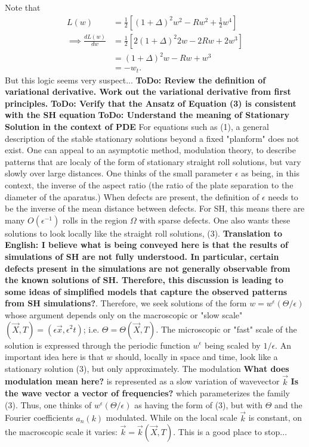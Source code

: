 \documentclass[12pt]{article}
\newcounter{solution}
\begin{document}
Note that
\begin{align*}
    L(w) &= \frac{1}{2}\left[ (1+\Delta)^2 w^2 -Rw^2 + \frac{1}{2}w^4\right]\\
    \implies \frac{dL(w)}{dw} &= \frac{1}{2}\left[ 2(1+\Delta)^2 2w -2Rw +2w^3 \right]\\
                              &= (1+\Delta)^2w -Rw + w^3\\
                              &= -w_t.
\end{align*}
But this logic seems very suspect... \textbf{ToDo: Review the definition of variational derivative. Work out the variational derivative from first principles.} \textbf{ToDo: Verify that the Ansatz of Equation (3) is consistent with the SH equation} \textbf{ToDo: Understand the meaning of Stationary Solution in the context of PDE}\newline
\hspace*{10mm} For equations such as (1), a general description of the stable stationary solutions beyond a fixed "planform" does not exist. One can appeal to an asymptotic method, modulation theory, to describe patterns that are localy of the form of stationary straight roll solutions, but vary slowly over large distances. One thinks of the small parameter $\epsilon$ as being, in this context, the inverse of the aspect ratio (the ratio of the plate separation to the diameter of the aparatus.) When defects are present, the definition of $\epsilon$ needs to be the inverse of the mean distance between defects. For SH, this means there are many $O(\epsilon^{-1})$ rolls in the region $\Omega$ with sparse defects. One also wants these solutions to look locally like the straight roll solutions, (3). \textbf{Translation to English: I believe what is being conveyed here is that the results of simulations of SH are not fully understood. In particular, certain defects present in the simulations are not generally observable from the known solutions of SH. Therefore, this discussion is leading to some ideas of simplified models that capture the observed patterns from SH simulations?}. Therefore, we seek solutions of the form $w = w^{\epsilon}(\Theta / \epsilon)$ whose argument depends only on the macroscopic or "slow scale" $(\vec{X},T)=(\epsilon \vec{x},\epsilon^2t)$; i.e. $\Theta = \Theta(\vec{X},T)$. The microscopic or "fast" scale of the solution is expressed through the periodic function $w^{\epsilon}$ being scaled by $1/\epsilon$. An important idea here is that $w$ should, locally in space and time, look like a stationary solution (3), but only approximately. The modulation \textbf{What does modulation mean here?} is represented as a slow variation of wavevector $\vec{k}$ \textbf{Is the wave vector a vector of frequencies?} which parameterizes the family (3). Thus, one thinks of $w^{\epsilon}(\Theta / \epsilon)$ as having the form of (3), but with $\Theta$ and the Fourier coefficients $a_n(k)$ modulated. While on the local scale $\vec{k}$ is constant, on the macroscopic scale it varies: $\vec{k}=\vec{k}(\vec{X},T)$. \newline
\hspace*{10mm} This is a good place to stop...
\end{document}
